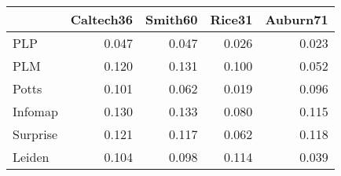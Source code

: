 \begin{tabular}{lrrrr}
\toprule
{} & Caltech36 & Smith60 & Rice31 & Auburn71 \\
\midrule
PLP      &     0.047 &   0.047 &  0.026 &    0.023 \\
PLM      &     0.120 &   0.131 &  0.100 &    0.052 \\
Potts    &     0.101 &   0.062 &  0.019 &    0.096 \\
Infomap  &     0.130 &   0.133 &  0.080 &    0.115 \\
Surprise &     0.121 &   0.117 &  0.062 &    0.118 \\
Leiden   &     0.104 &   0.098 &  0.114 &    0.039 \\
\bottomrule
\end{tabular}
